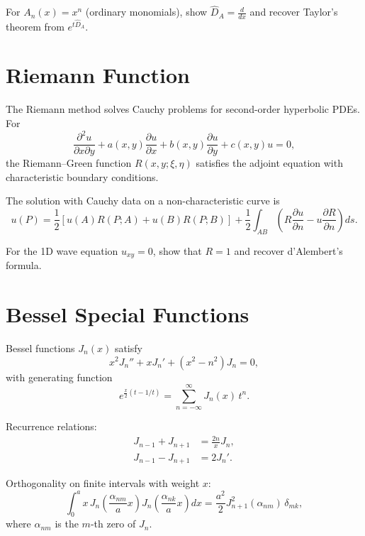 \begin{exercise}
For $A_n(x)=x^n$ (ordinary monomials), show
$\hat D_A=\frac{d}{dx}$ and recover Taylor's theorem from $e^{t\hat D_A}$.
\end{exercise}

\section{Riemann Function}

The Riemann method solves Cauchy problems for second-order hyperbolic
PDEs. For
\begin{equation}
\frac{\partial^2 u}{\partial x\partial y} + a(x,y)\frac{\partial u}{\partial x}
+ b(x,y)\frac{\partial u}{\partial y} + c(x,y)u = 0,
\label{eq:8.5.1}
\end{equation}
the Riemann--Green function $R(x,y;\xi,\eta)$ satisfies the adjoint equation
with characteristic boundary conditions.

The solution with Cauchy data on a non-characteristic curve is
\begin{equation}
u(P) = \frac12\left[u(A)R(P;A)+u(B)R(P;B)\right]
+ \frac12\int_{AB}\left(R\frac{\partial u}{\partial n}-u\frac{\partial R}{\partial n}\right)ds.
\label{eq:8.5.2}
\end{equation}

\begin{exercise}
For the 1D wave equation $u_{xy}=0$, show that $R=1$ and recover
d'Alembert's formula.
\end{exercise}

\section{Bessel Special Functions}

Bessel functions $J_n(x)$ satisfy
\begin{equation}
x^2J_n''+xJ_n'+(x^2-n^2)J_n=0,
\label{eq:8.6.1}
\end{equation}
with generating function
\begin{equation}
e^{\frac{x}{2}(t-1/t)} = \sum_{n=-\infty}^{\infty} J_n(x)\,t^n.
\label{eq:8.6.2}
\end{equation}

Recurrence relations:
\begin{align}
J_{n-1}+J_{n+1} &= \frac{2n}{x}J_n,\\
J_{n-1}-J_{n+1} &= 2J_n'.
\label{eq:8.6.3}
\end{align}

Orthogonality on finite intervals with weight $x$:
\begin{equation}
\int_0^a x\,J_n\!\left(\frac{\alpha_{nm}}{a}x\right)
J_n\!\left(\frac{\alpha_{nk}}{a}x\right)dx
= \frac{a^2}{2}J_{n+1}^2(\alpha_{nm})\,\delta_{mk},
\label{eq:8.6.4}
\end{equation}
where $\alpha_{nm}$ is the $m$-th zero of $J_n$.

